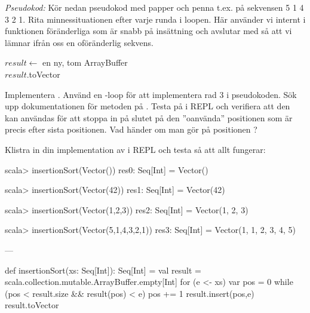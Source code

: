 \Subtask \emph{Pseudokod:} Kör nedan pseudokod med papper och penna t.ex. på sekvensen 5 1 4 3 2 1. Rita minnessituationen efter varje runda i loopen. Här använder vi internt i funktionen föränderliga  som är snabb på insättning och avslutar med  så att vi lämnar ifrån oss en oföränderlig sekvens.

\begin{algorithm}[H]
    $result \leftarrow$ en ny, tom ArrayBuffer \\
    $result$.toVector
\end{algorithm}


\Subtask Implementera . Använd en -loop för att implementera rad 3 i pseudokoden. Sök upp dokumentationen för metoden  på . Testa   på  i REPL och verifiera att den kan användas för att stoppa in på slutet på den ''oanvända'' positionen som är precis efter sista positionen. Vad händer om man gör  på positionen ?

Klistra in din implementation av  i REPL och testa så att allt fungerar:
\begin{REPL}
scala> insertionSort(Vector())
res0: Seq[Int] = Vector()

scala> insertionSort(Vector(42))
res1: Seq[Int] = Vector(42)

scala> insertionSort(Vector(1,2,3))
res2: Seq[Int] = Vector(1, 2, 3)

scala> insertionSort(Vector(5,1,4,3,2,1))
res3: Seq[Int] = Vector(1, 1, 2, 3, 4, 5)
\end{REPL}


\SOLUTION

\TaskSolved \what


\SubtaskSolved ---

\SubtaskSolved

\begin{Code}
def insertionSort(xs: Seq[Int]): Seq[Int] = {
  val result = scala.collection.mutable.ArrayBuffer.empty[Int]
  for (e <- xs) {
    var pos = 0
    while (pos < result.size && result(pos) < e) pos += 1
    result.insert(pos,e)
  }
  result.toVector
}
\end{Code}

\QUESTEND





